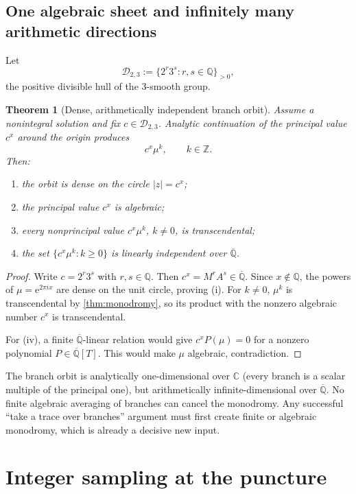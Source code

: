 \documentclass[11pt,oneside]{article}
\newtheorem{theorem}{Theorem}[section]
\theoremstyle{definition}
\theoremstyle{remark}
\newcommand{\Z}{\mathbb Z}
\newcommand{\Q}{\mathbb Q}
\newcommand{\C}{\mathbb C}
\newcommand{\Qbar}{\overline{\mathbb Q}}
\newcommand{\e}{\mathrm e}
\begin{document}
\subsection{One algebraic sheet and infinitely many arithmetic directions}

Let
\[
  \mathcal D_{2,3}:=\{2^r3^s:r,s\in\Q\}_{>0},
\]
the positive divisible hull of the \(3\)-smooth group.

\begin{theorem}[Dense, arithmetically independent branch orbit]
\label{thm:branch-orbit}
Assume a nonintegral solution and fix \(c\in\mathcal D_{2,3}\).  Analytic continuation of the principal value \(c^x\) around the origin produces
\[
  c^x\mu^k,\qquad k\in\Z.
\]
Then:
\begin{enumerate}[label=(\roman*)]
\item the orbit is dense on the circle \(|z|=c^x\);
\item the principal value \(c^x\) is algebraic;
\item every nonprincipal value \(c^x\mu^k\), \(k\ne0\), is transcendental;
\item the set \(\{c^x\mu^k:k\ge0\}\) is linearly independent over \(\Qbar\).
\end{enumerate}
\end{theorem}

\begin{proof}
Write \(c=2^r3^s\) with \(r,s\in\Q\).  Then \(c^x=M^rA^s\in\Qbar\).  Since \(x\notin\Q\), the powers of \(\mu=\e^{2\pi ix}\) are dense on the unit circle, proving (i).  For \(k\ne0\), \(\mu^k\) is transcendental by \cref{thm:monodromy}, so its product with the nonzero algebraic number \(c^x\) is transcendental.

For (iv), a finite \(\Qbar\)-linear relation would give
\(c^x P(\mu)=0\) for a nonzero polynomial \(P\in\Qbar[T]\).  This would make \(\mu\) algebraic, contradiction.
\end{proof}

\begin{auditbox}
The branch orbit is analytically one-dimensional over \(\C\) (every branch is a scalar multiple of the principal one), but arithmetically infinite-dimensional over \(\Qbar\).  No finite algebraic averaging of branches can cancel the monodromy.  Any successful ``take a trace over branches'' argument must first create finite or algebraic monodromy, which is already a decisive new input.
\end{auditbox}

\section{Integer sampling at the puncture}
\end{document}
